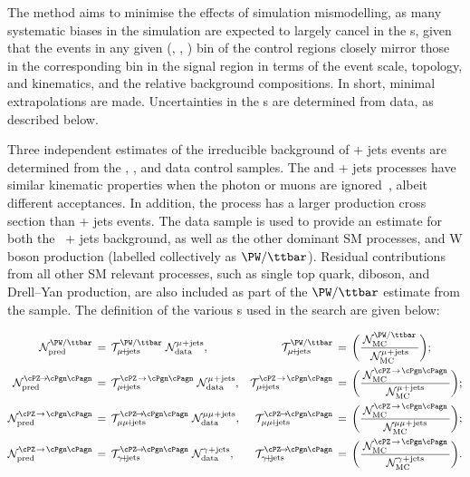 The method aims to minimise the effects of simulation mismodelling, as
many systematic biases in the simulation are expected to largely
cancel in the {\tf}s, given that the events in any given (\njet, \nb,
\scalht) bin of the control regions closely mirror those in the
corresponding bin in the signal region in terms of the event scale,
topology, and kinematics, and the relative background compositions. In
short, minimal extrapolations are made. Uncertainties in the {\tf}s
are determined from data, as described below.

Three independent estimates of the irreducible background of \znunu +
jets events are determined from the \gj, \mmj, and \mj data control
samples. The \gj and \zmumu + jets processes have similar kinematic
properties when the photon or muons are ignored~\cite{Bern:2011pa},
albeit different acceptances. In addition, the \gj process has a
larger production cross section than \znunu + jets events. The \mj
data sample is used to provide an estimate for both the \znunu\ + jets
background, as well as the other dominant SM processes, \ttbar and W
boson production (labelled collectively as $\PW/\ttbar$). Residual
contributions from all other SM relevant processes, such as single top
quark, diboson, and Drell--Yan production, are also included as part
of the $\PW/\ttbar$ estimate from the \mj sample. The definition of
the various {\tf}s used in the search are given below:

\begin{align} 
  \mathcal{N}^\text{\PW/\ttbar}_\text{pred} \, & = \,
  \tf^\text{\PW/\ttbar}_{\mj} \; 
  \mathcal{N}^\text{\mj}_\text{data}, &
  \tf^\text{\PW/\ttbar}_{\mj} \, & = \,
  \bigg( 
  \frac{\,\mathcal{N}^{\PW/\ttbar}_\text{MC}\,}
  {\mathcal{N}^\text{\mj}_\text{MC}}
  \bigg); \\
  \mathcal{N}^{\znunu}_\text{pred} \, & = \,
  \tf^{\text{\znunu}}_{\mj} \; 
  \mathcal{N}^\text{\mj}_\text{data}, &
  \tf^{\text{\znunu}}_{\mj} \, & = \,
  \bigg( 
  \frac{\,\mathcal{N}^\text{\znunu}_\text{MC}\,}
  {\mathcal{N}^\text{\mj}_\text{MC}}
  \bigg); \\
  \mathcal{N}^\text{\znunu}_\text{pred} \, & = \,
  \tf^{\znunu}_{\mmj}  \;
  \mathcal{N}^\text{\mmj}_\text{data}, &
  \tf^{\znunu}_{\mmj}  \, & = \,
  \bigg( 
  \frac{\,\mathcal{N}^\text{\znunu}_\text{MC}\,}
  {\mathcal{N}^\text{\mmj}_\text{MC}}
  \bigg); \\
  \mathcal{N}^\text{\znunu}_\text{pred} \, & = \,
  \tf^{\znunu}_{\gj}  \;
  \mathcal{N}^\text{\gj}_\text{data}, &
  \tf^{\znunu}_{\gj}  \, & = \,
  \bigg( 
  \frac{\,\mathcal{N}^\text{\znunu}_\text{MC}\,}
  {\mathcal{N}^\text{\gj}_\text{MC}}
  \bigg).
\end{align} 

